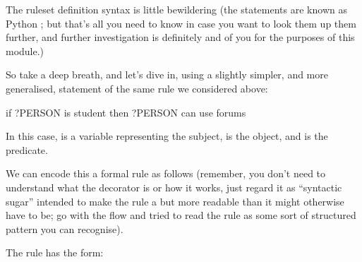 \documentclass[letterpaper,10pt,english]{sphinxmanual}
\begin{document}
The ruleset definition syntax is little bewildering (the  statements are known as Python ; but that’s all you need to know in case you want to look them up them further, and further investigation is definitely  and  of you for the purposes of this module.)

So take a deep breath, and let’s dive in, using a slightly simpler, and more generalised, statement of the same rule we considered above:

\begin{sphinxVerbatim}[commandchars=\\\{\}]
if ?PERSON is student
    then ?PERSON can use forums
\end{sphinxVerbatim}

In this case,  is a variable representing the subject,  is the object, and  is the predicate.

We can encode this a formal rule as follows (remember, you don’t need to understand what the  decorator is or how it works, just regard it as “syntactic sugar” intended to make the rule a but more readable than it might otherwise have to be; go with the flow and tried to read the rule as some sort of structured pattern you can recognise).

\begin{sphinxVerbatim}[commandchars=\\\{\}]
 
 
      
\end{sphinxVerbatim}

The rule has the form:

\begin{sphinxVerbatim}[commandchars=\\\{\}]
 
\end{sphinxVerbatim}
\end{document}
